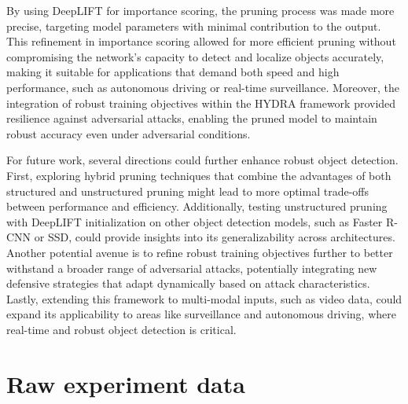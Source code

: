 \documentclass[journal,onecolumn,12pt]{IEEEtran}
\begin{document}
By using DeepLIFT for importance scoring, the pruning process was made more precise, targeting model parameters with minimal contribution to the output. This refinement in importance scoring allowed for more efficient pruning without compromising the network's capacity to detect and localize objects accurately, making it suitable for applications that demand both speed and high performance, such as autonomous driving or real-time surveillance. Moreover, the integration of robust training objectives within the HYDRA framework provided resilience against adversarial attacks, enabling the pruned model to maintain robust accuracy even under adversarial conditions.

For future work, several directions could further enhance robust object detection. First, exploring hybrid pruning techniques that combine the advantages of both structured and unstructured pruning might lead to more optimal trade-offs between performance and efficiency. Additionally, testing unstructured pruning with DeepLIFT initialization on other object detection models, such as Faster R-CNN or SSD, could provide insights into its generalizability across architectures. Another potential avenue is to refine robust training objectives further to better withstand a broader range of adversarial attacks, potentially integrating new defensive strategies that adapt dynamically based on attack characteristics. Lastly, extending this framework to multi-modal inputs, such as video data, could expand its applicability to areas like surveillance and autonomous driving, where real-time and robust object detection is critical.

\newpage
\printbibliography
\newpage

\appendices
\section{Raw experiment data}
\label{appendix:tables}
\end{document}
